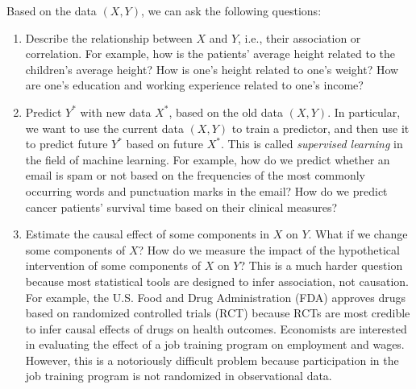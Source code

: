 Based on the data $(X,Y)$, we can ask the following questions:
\begin{enumerate}[label=(Q\arabic*), ref=Q\arabic*]
\item Describe the relationship between $X$ and $Y$, i.e., their association
or correlation. For example, how is the patients' average height related
to the children's average height? How is one's height related to one's
weight? How are one's education and working experience related to one's income?

\item Predict $Y^{*}$ with new data $X^{*}$, based on the old data $(X, Y)$. In particular,
we want to use the current data $(X,Y)$ to train a predictor, and
then use it to predict future $Y^*$ based on future $X^*$. This is called
{\it supervised learning} in the field of machine learning. For example,
how do we predict whether an email is spam or not based on the frequencies of the most commonly occurring words and punctuation marks in the email? How do we predict cancer patients' survival time based on their clinical measures?


\item Estimate the causal effect of some components in $X$ on $Y$. What if we change
some components of $X$? How do we measure the impact of the hypothetical intervention of some components of $X$ on $Y$? This is a much harder question because most statistical tools are designed to infer association, not causation. For example, the U.S. Food and Drug Administration (FDA) approves drugs based on randomized controlled trials (RCT) because RCTs are most credible to infer causal effects of drugs on health outcomes. Economists are interested in evaluating the effect of a job training program on employment and wages. However, this is a notoriously difficult problem because participation in the job training program is not randomized in observational data. 
\end{enumerate}




